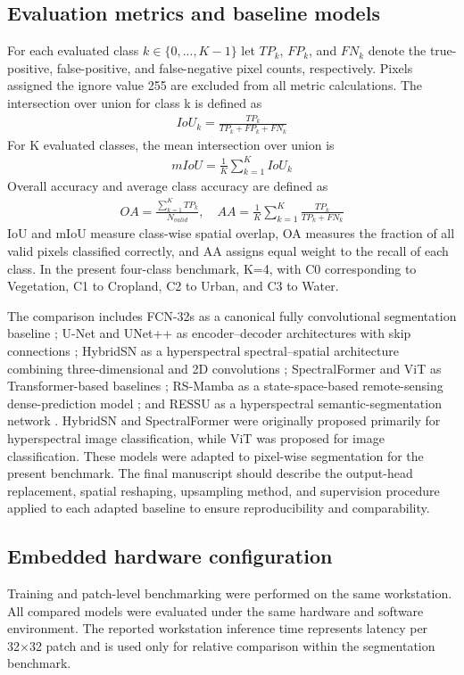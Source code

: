 \documentclass[a4paper,fleqn]{cas-dc}
\begin{document}
\subsection{Evaluation metrics and baseline models}
 For each evaluated class \(k \in \{0,...,K-1\} \) let \(TP_k\), \(FP_k\), and \(FN_k\) denote the true-positive, false-positive, and false-negative pixel counts, respectively. Pixels assigned the ignore value 255 are excluded from all metric calculations. The intersection over union for class k is defined as
 \begin{eqnarray}
 	IoU_k = \frac{TP_k}{TP_k + FP_k + FN_k}
 \end{eqnarray}
For K evaluated classes, the mean intersection over union is
\begin{eqnarray}
	mIoU = \frac{1}{K}\sum_{k=1}^{K} IoU_k
\end{eqnarray}
Overall accuracy and average class accuracy are defined as
\begin{eqnarray}
	OA = \frac{\sum_{k=1}^{K} TP_k}{N_{valid}}, \quad AA = \frac{1}{K}\sum_{k=1}^{K}\frac{TP_k}{TP_k + FN_k}
\end{eqnarray}
IoU and mIoU measure class-wise spatial overlap, OA measures the fraction of all valid pixels classified correctly, and AA assigns equal weight to the recall of each class. In the present four-class benchmark, K=4, with C0 corresponding to Vegetation, C1 to Cropland, C2 to Urban, and C3 to Water.

The comparison includes FCN-32s as a canonical fully convolutional segmentation baseline \cite{long2015fcn}; U-Net and UNet++ as encoder–decoder architectures with skip connections \cite{ronneberger2015unet, zhou2020unetpp}; HybridSN as a hyperspectral spectral–spatial architecture combining three-dimensional and 2D convolutions \cite{roy2020hybridSN}; SpectralFormer and ViT as Transformer-based baselines \cite{dosovitskiy2021vit, hong2021spectralformer}; RS-Mamba as a state-space-based remote-sensing dense-prediction model \cite{zhao2024rs}; and RESSU as a hyperspectral semantic-segmentation network \cite{wu2024fullscale}. HybridSN and SpectralFormer were originally proposed primarily for hyperspectral image classification, while ViT was proposed for image classification. These models were adapted to pixel-wise segmentation for the present benchmark. The final manuscript should describe the output-head replacement, spatial reshaping, upsampling method, and supervision procedure applied to each adapted baseline to ensure reproducibility and comparability.
\subsection{Embedded hardware configuration}\label{sec:HWconfig}
Training and patch-level benchmarking were performed on the same workstation. All compared models were evaluated under the same hardware and software environment. The reported workstation inference time represents latency per 32×32 patch and is used only for relative comparison within the segmentation benchmark.
\end{document}
